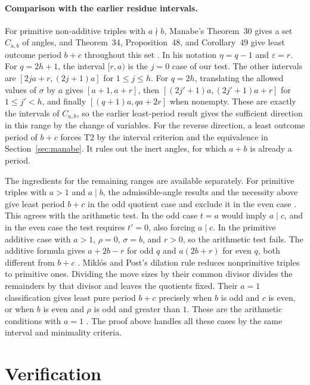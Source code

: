 \documentclass[11pt]{article}
\begin{document}
\paragraph{Comparison with the earlier residue intervals.}
For primitive non-additive triples with $a\nmid b$, Manabe's
Theorem~30 gives a set $C_{a,b}$ of angles, and Theorem~34,
Proposition~48, and Corollary~49 give least outcome period $b+c$
throughout this set \cite{manabe}. In his notation $\eta=q-1$ and
$\varepsilon=r$. For $q=2h+1$, the interval $[r,a)$ is the $j=0$
case of our test. The other intervals are $[2ja+r,(2j+1)a]$ for
$1\le j\le h$. For $q=2h$, translating the allowed values of
$\sigma$ by $a$ gives $[a+1,a+r]$, then
$[(2j'+1)a,(2j'+1)a+r]$ for $1\le j'<h$, and finally
$[(q+1)a,qa+2r]$ when nonempty. These are exactly the intervals of
$C_{a,b}$, so the earlier least-period result gives the sufficient
direction in this range by the change of variables. For the reverse
direction, a least outcome period of $b+c$ forces T2 by the interval
criterion and the equivalence in Section~\ref{sec:manabe}. It rules
out the inert angles, for which $a+b$ is already a period.

The ingredients for the remaining ranges are available separately.
For primitive triples with $a>1$ and $a\mid b$, the admissible-angle
results and the necessity above give least period $b+c$ in the odd
quotient case and exclude it in the even case
\cite[Theorems~30 and~34, Corollary~49, and Proposition~61]{manabe}. This agrees
with the arithmetic test. In the odd case $t=a$ would imply $a\mid c$,
and in the even case the test requires $t'=0$, also forcing $a\mid c$.
In the primitive additive case with $a>1$,
$\rho=0$, $\sigma=b$, and $r>0$, so the arithmetic test fails. The
additive formula gives $a+2b-r$ for odd $q$ and $a(2b+r)$ for even
$q$, both different from $b+c$ \cite[Theorem~36]{manabe}.
Mikl\'os and Post's dilation rule reduces nonprimitive triples to
primitive ones. Dividing the move sizes by their common divisor
divides the remainders by that divisor and leaves the quotients fixed.
Their $a=1$ classification gives least pure period $b+c$ precisely
when $b$ is odd and $c$ is even, or when $b$ is even and $\rho$ is odd
and greater than $1$. These are the arithmetic conditions with $a=1$
\cite[Proposition~5 and Theorem~20]{miklos-post}. The proof above handles
all these cases by the same interval and minimality criteria.

\section*{Verification}
\end{document}
